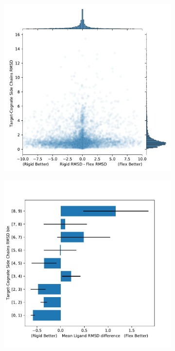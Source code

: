 \documentclass[journal=jcisd8,manuscript=article]{achemso}
\begin{document}
\begin{figure}    
        \begin{subfigure}[b]{0.48\textwidth}
		\centering
		\includegraphics[width=\textwidth]{figures/crossdocking-flex/e8-rmsd-diff_vs_side-chain-rmsd.pdf}
		\caption{}
		\label{fig:flexRMSDdist}
        \end{subfigure}    
        \begin{subfigure}[b]{0.48\textwidth}    
		\centering
		\includegraphics[width=\textwidth]{figures/crossdocking-flex/e8-mean-diff-rmsd_vs_flex-rmsd-bin_hist.pdf}

\end{subfigure}
\end{figure}
\end{document}
